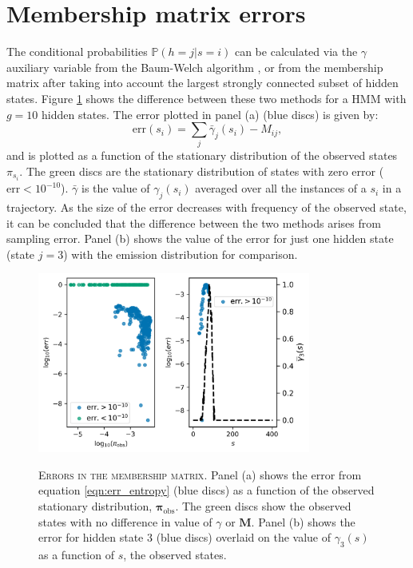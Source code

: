 \section{Membership matrix errors}\label{sec:app_membership_errors}

The conditional probabilities $\mathbb{P}(h=j|s=i)$ can be calculated via the $\gamma$ auxiliary variable from the Baum-Welch algorithm \cite{baumMaximizationTechniqueOccurring1970, welch2003hidden}, or from the membership matrix after taking into account the largest strongly connected subset of hidden states.  Figure \ref{fig:membership_error} shows the difference between these two methods for a HMM with $g=10$ hidden states.  The error plotted in panel (a) (blue discs) is given by:
\begin{equation}\label{eqn:err_entropy}
\mathrm{err}(s_{i}) = \sum_j\bar{\gamma}_{j}(s_{i}) - M_{ij}, 
\end{equation}
and is plotted as a function of the stationary distribution of the observed states $\pi_{s_{i}}$. The green discs are the stationary distribution of states with zero error ($\mathrm{err}<10^{-10}$). $\bar{\gamma}$ is the value of $\gamma_{j}(s_{i})$ averaged over all the instances of a $s_{i}$ in a trajectory. As the size of the error decreases with frequency of the observed state, it can be concluded that the difference between the two methods arises from sampling error. Panel (b) shows the value of the error for just one hidden state (state $j=3$) with the emission distribution for comparison. 
\begin{figure}
    \centering
    \caption[Errors in the membership matrix]{\textsc{Errors in the membership matrix}. Panel (a) shows the error from equation \ref{eqn:err_entropy} (blue discs) as a function of the observed stationary distribution, $\bm{\pi}_{\mathrm{obs}}$. The green discs show the observed states with no difference in value of $\gamma$ or $\mathbf{M}$. Panel (b) shows the error for hidden state $3$ (blue discs) overlaid on the value of $\gamma_{3}(s)$ as a function of $s$, the observed states.}
    \includegraphics[width=0.8\textwidth]{chapters/hmm_selection/figures/entropy_error_explanation.png}
    \label{fig:membership_error}
\end{figure}

